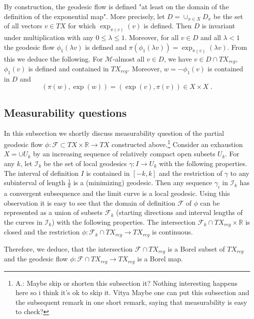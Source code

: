 \documentclass[12pt,leqno]{amsart}
\numberwithin{equation}{section}
\theoremstyle{definition}
\theoremstyle{remark}
\newcommand{\R}{\mathbb{R}}
\begin{document}
By construction, the geodesic flow is defined "at least on the domain of the definition of the exponential map".
More precisely, let $D=\cup _{x\in X} D_x$ be the set of all vectors $v\in TX$ for which $\exp _{\pi(v)} (v)$ is defined.
Then $D$ is invariant under multiplication with any $0\leq \lambda \leq 1$.  Moreover, for all $v\in D$ and all $\lambda <1$
the geodesic flow $\phi_1 (\lambda v)$ is defined and $\pi (\phi_1 (\lambda v))=  \exp _{\pi (v)} (\lambda v)$.
From this we deduce the following.
 For $\mathcal M$-almost all $v\in D$, we have $v\in D\cap TX_{reg}$, $\phi _1(v)$ is defined  and contained in $TX_{reg}$. Moreover,
 $w=-\phi_1 (v)$ is contained in $D$  and
\begin{equation} \label{eq:symm}
(\pi (w), \exp (w))=(\exp (v), \pi (v)) \in X\times X\; .
\end{equation}


\subsection{Measurability questions} \label{subsec:measur} 
 In this subsection we shortly discuss measurability question of the partial geodesic flow
$\phi:\mathcal F\subset TX\times \R \to TX$ constructed above.\footnote{A.:  Maybe skip or shorten this subsection it?{\color{red} Nothing interesting happens here so i think it's ok to skip it. Vitya}   Maybe one can put this subsection and the subsequent remark in one short remark, saying that 
measurability is easy to check?}
Consider an exhaustion  $X=\cup U_k$ by an increasing sequence of relatively compact open subsets $U_k$.  For any $k$, let $\mathcal I_k$ be the set of local geodesics $\gamma :I\to U_k$ with the following properties. The interval of definition $I$ is contained in $[- k , k]$  and the restriction of $\gamma$ to any subinterval of length $\frac 1 k$ is a (minimizing) geodesic. Then any sequence $\gamma _i$ in $\mathcal I_k$ has a convergent subsequence and the limit curve is a local geodesic.  Using this observation it is easy to see that the domain of definition $\mathcal F$
of $\phi$ can be represented as a union of subsets  $\mathcal F_k$  (starting directions and interval lengths of the curves in $\mathcal I_k$) with the following properties. The intersection  $\mathcal F_k \cap TX_{reg} \times \R$ is closed and the restriction $\phi:\mathcal F_k \cap TX_{reg} \to TX_{reg}$ is continuous.

Therefore, we deduce, that the intersection $\mathcal F\cap TX_{reg}$ is a Borel subset of $TX_{reg}$ and the geodesic flow
$\phi :\mathcal F\cap TX_{reg} \to TX_{reg}$ is a Borel map.
\end{document}
